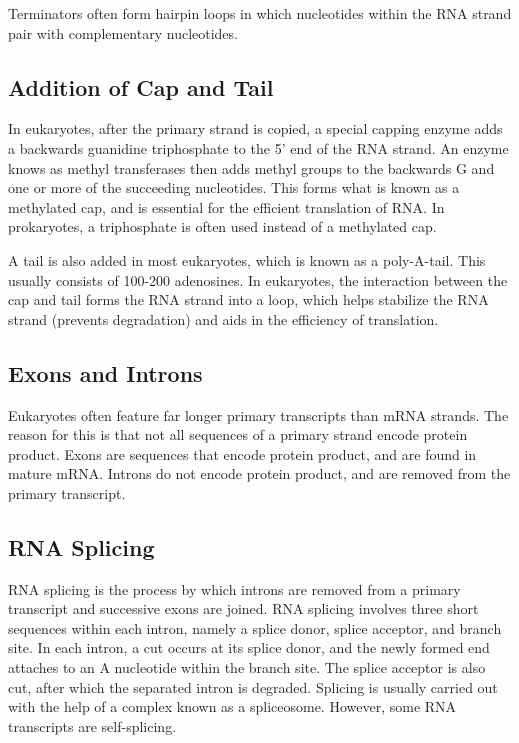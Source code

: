 \documentclass[12pt,titlepage]{article}
\begin{document}
        Terminators often form hairpin loops in which nucleotides within the RNA strand pair with complementary nucleotides.

    \subsection{Addition of Cap and Tail}
      In eukaryotes, after the primary strand is copied, a special capping enzyme adds a backwards guanidine triphosphate to the 5' end of the RNA strand.
      An enzyme knows as methyl transferases then adds methyl groups to the backwards G and one or more of the succeeding nucleotides. This forms what is
      known as a methylated cap, and is essential for the efficient translation of RNA. In prokaryotes, a triphosphate is often used instead of a methylated cap.

      A tail is also added in most eukaryotes, which is known as a poly-A-tail. This usually consists of 100-200 adenosines. In eukaryotes, the interaction
      between the cap and tail forms the RNA strand into a loop, which helps stabilize the RNA strand (prevents degradation) and aids in the efficiency of
      translation.

    \subsection{Exons and Introns}
      Eukaryotes often feature far longer primary transcripts than mRNA strands. The reason for this is that not all sequences of a primary strand encode
      protein product. Exons are sequences that encode protein product, and are found in mature mRNA. Introns do not encode protein product, and are removed
      from the primary transcript.

    \subsection{RNA Splicing}
      RNA splicing is the process by which introns are removed from a primary transcript and successive exons are joined. RNA splicing involves three
      short sequences within each intron, namely a splice donor, splice acceptor, and branch site. In each intron, a cut occurs at its splice donor,
      and the newly formed end attaches to an A nucleotide within the branch site. The splice acceptor is also cut, after which the separated intron
      is degraded. Splicing is usually carried out with the help of a complex known as a spliceosome. However, some RNA transcripts are self-splicing.
\end{document}
